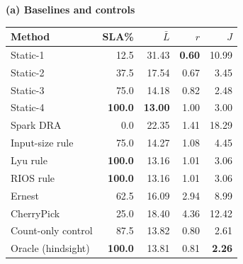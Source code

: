 \caption{Live panel at idle ($K=0$), one delivery per query. $\bar L$: mean latency (s); $r$: total core-hours / Static-4; $J$: Eq.~\eqref{eq:objective}. Successful profiling enters $r$ and $J$, but not delivered latency. The oracle is a measured-grid hindsight bound. PRISM enables both stages. Bold: panel-wise optima (higher SLA; lower other metrics), with displayed ties retained.}\label{tab:main}\centering\scriptsize
\setlength{\tabcolsep}{2pt}\renewcommand{\arraystretch}{1.06}
\begin{minipage}[t]{.485\textwidth}\centering\textbf{(a) Baselines and controls}\par\smallskip
\begin{tabular*}{\linewidth}{@{\extracolsep{\fill}}lrrrr@{}}
\toprule
\mbox{Method} & \mbox{SLA\%} & \mbox{$\bar L$} & \mbox{$r$} & \mbox{$J$}\\\midrule
Static-1 & 12.5 & 31.43 & \textbf{0.60} & 10.99\\
Static-2 & 37.5 & 17.54 & 0.67 & 3.45\\
Static-3 & 75.0 & 14.18 & 0.82 & 2.48\\
Static-4 & \textbf{100.0} & \textbf{13.00} & 1.00 & 3.00\\
Spark DRA & 0.0 & 22.35 & 1.41 & 18.29\\
Input-size rule & 75.0 & 14.27 & 1.08 & 4.45\\
Lyu rule & \textbf{100.0} & 13.16 & 1.01 & 3.06\\
RIOS rule & \textbf{100.0} & 13.16 & 1.01 & 3.06\\
Ernest & 62.5 & 16.09 & 2.94 & 8.99\\
CherryPick & 25.0 & 18.40 & 4.36 & 12.42\\
Count-only control & 87.5 & 13.82 & 0.80 & 2.61\\
Oracle (hindsight) & \textbf{100.0} & 13.81 & 0.81 & \textbf{2.26}\\
\bottomrule\end{tabular*}\end{minipage}
\hfill
